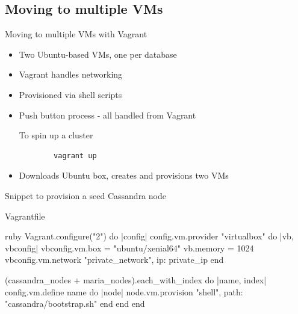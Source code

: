 \documentclass[xcolor=dvipsnames]{beamer}
\begin{document}
\subsection{Moving to multiple VMs}
\begin{frame}[fragile]{Moving to multiple VMs with Vagrant}
  \begin{itemize}
    \item Two Ubuntu-based VMs, one per database
    \item Vagrant handles networking
    \item Provisioned via shell scripts
    \item Push button process - all handled from Vagrant
    \pause
    \begin{block}{To spin up a cluster}
      \begin{verbatim}
        vagrant up\end{verbatim}
    \end{block}
    \item Downloads Ubuntu box, creates and provisions two VMs
  \end{itemize}
\end{frame}

\begin{frame}[fragile]{Snippet to provision a seed Cassandra node}
  \begin{block}{Vagrantfile}
  \begin{code}{ruby}
Vagrant.configure("2") do |config|
  config.vm.provider "virtualbox" do |vb, vbconfig|
    vbconfig.vm.box = "ubuntu/xenial64"
    vb.memory       = 1024
    vbconfig.vm.network "private_network", ip: private_ip
  end

  (cassandra_nodes + maria_nodes).each_with_index do |name, index|
    config.vm.define name do |node|
      node.vm.provision "shell", path: "cassandra/bootstrap.sh"
    end
  end
end
  \end{code}
  \end{block}
\end{frame}
\end{document}
